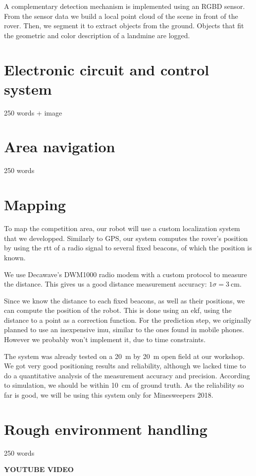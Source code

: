 A complementary detection mechanism is implemented using an RGBD sensor.
From the sensor data we build a local point cloud of the scene in front of the rover.
Then, we segment it to extract objects from the ground.
Objects that fit the geometric and color description of a landmine are logged.

\section{Electronic circuit and control system}
250 words + image

\section{Area navigation}
250 words

\section{Mapping}

To map the competition area, our robot will use a custom localization system that we developped.
Similarly to GPS, our system computes the rover's position by using the \gls{rtt} of a radio signal to several fixed beacons, of which the position is known.

We use Decawave's DWM1000 radio modem with a custom protocol to measure the distance.
This gives us a good distance measurement accuracy: $1 \sigma = \SI{3}{\centi\meter}$.

Since we know the distance to each fixed beacons, as well as their positions, we can compute the position of the robot.
This is done using an \gls{ekf}, using the distance to a point as a correction function.
For the prediction step, we originally planned to use an inexpensive \gls{imu}, similar to the ones found in mobile phones.
However we probably won't implement it, due to time constraints.

The system was already tested on a \SI{20}{\meter} by \SI{20}{\meter} open field at our workshop.
We got very good positioning results and reliability, although we lacked time to do a quantitative analysis of the measurement accuracy and precision.
According to simulation, we should be within \SI{10}{\centi\meter} of ground truth.
As the reliability so far is good, we will be using this system only for Minesweepers 2018.


\section{Rough environment handling}

250 words

\textbf{YOUTUBE VIDEO}
